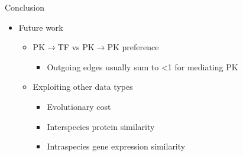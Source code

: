 \begin{frame}{Conclusion}
\begin{itemize}
    \item Future work
    \begin{itemize}
        \item PK$\rightarrow$TF vs PK$\rightarrow$PK preference
        \begin{itemize}
            \item Outgoing edges usually sum to <1 for mediating PK
        \end{itemize}
    \item Exploiting other data types
        \begin{itemize}
            \item Evolutionary cost
            \item Interspecies protein similarity 
            \item Intraspecies gene expression similarity 

\end{itemize}
\end{itemize}
\end{itemize}
\end{frame}
